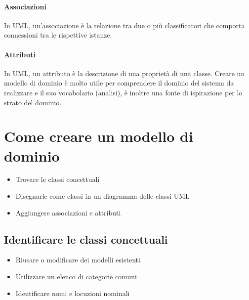 \paragraph*{Associazioni} In UML, un'associazione è la relazione tra due o più
classificatori che comporta connessioni tra le rispettive istanze.
\paragraph*{Attributi} In UML, un attributo è la descrizione di una proprietà
di una classe.
Creare un modello di dominio è molto utile per comprendere il dominio del sistema da
realizzare e il suo vocabolario (analisi), è inoltre una fonte di ispirazione per lo strato
del dominio.
\section{Come creare un modello di dominio}
\begin{itemize}
    \item Trovare le classi concettuali
    \item Disegnarle come classi in un diagramma delle classi UML
    \item Aggiungere associazioni e attributi
\end{itemize}
\subsection*{Identificare le classi concettuali}
\begin{itemize}
    \item Riusare o modificare dei modelli esistenti
    \item Utilizzare un elenco di categorie comuni
    \item Identificare nomi e locuzioni nominali
\end{itemize}

